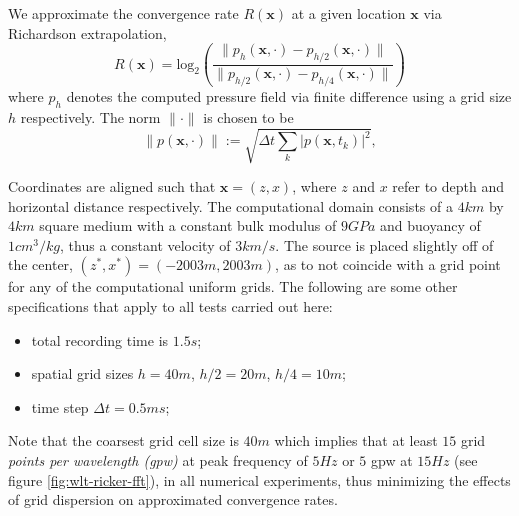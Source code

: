 We approximate the convergence rate $R(\mathbf x)$ at a given location $\mathbf x$ via Richardson extrapolation,
\[
        R(\mathbf x) = \text{log}_2 \left( \frac{\| p_{h}(\mathbf x,\cdot)-p_{h/2}(\mathbf x,\cdot)\| }{\|p_{h/2}(\mathbf x,\cdot)-p_{h/4}(\mathbf x,\cdot)\| } \right)
\] 
where $p_h$ denotes the computed pressure field via finite difference using a grid size $h$ respectively.
The norm $\|\cdot\|$ is chosen to be 
\[
        \|p(\mathbf x,\cdot) \| := \sqrt{ \Delta t \sum_{k} |p(\mathbf x,t_k)|^2},
\]

Coordinates are aligned such that $\mathbf x = (z,x)$, 
where $z$ and $x$ refer to depth and horizontal distance respectively.  
The computational domain consists of a $4km$ by $4km$ square medium
with a constant bulk modulus of $9 GPa$ and buoyancy of $1 cm^3/kg$,
thus a constant velocity of $3 km/s$.
The source is placed slightly off of the center, $(z^*,x^*)=(-2003m,2003m)$, 
as to not coincide with a grid point for any of the computational uniform grids.
The following are some other specifications that apply to all tests carried out here:
\begin{itemize}
        \item total recording time is $1.5s$;
        \item spatial grid sizes $h=40m$, $h/2=20m$, $h/4=10m$;
        \item time step $\Delta t=0.5ms$;
\end{itemize}
Note that the coarsest grid cell size is $40m$ which implies that at least $15$ 
grid {\em points per wavelength (gpw)} at peak frequency of $5Hz$ or $5$ gpw at $15Hz$ 
(see figure \ref{fig:wlt-ricker-fft}), in all numerical experiments, 
thus minimizing the effects of grid dispersion on approximated convergence rates.


